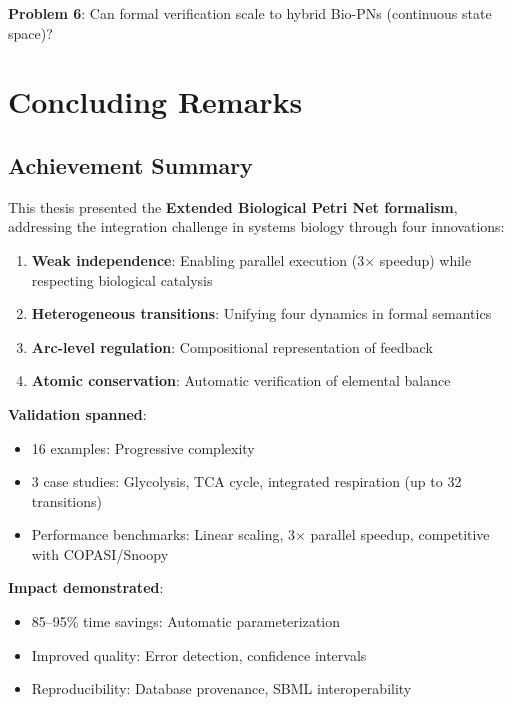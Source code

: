 \textbf{Problem 6}: Can formal verification scale to hybrid Bio-PNs (continuous state space)?

\section{Concluding Remarks}
\label{sec:concluding-remarks}

\subsection{Achievement Summary}
\label{subsec:achievement-summary}

This thesis presented the \textbf{Extended Biological Petri Net formalism}, addressing the integration challenge in systems biology through four innovations:

\begin{enumerate}
    \item \textbf{Weak independence}: Enabling parallel execution (3$\times$ speedup) while respecting biological catalysis
    \item \textbf{Heterogeneous transitions}: Unifying four dynamics in formal semantics
    \item \textbf{Arc-level regulation}: Compositional representation of feedback
    \item \textbf{Atomic conservation}: Automatic verification of elemental balance
\end{enumerate}

\textbf{Validation spanned}:
\begin{itemize}
    \item 16 examples: Progressive complexity
    \item 3 case studies: Glycolysis, TCA cycle, integrated respiration (up to 32 transitions)
    \item Performance benchmarks: Linear scaling, 3$\times$ parallel speedup, competitive with COPASI/Snoopy
\end{itemize}

\textbf{Impact demonstrated}:
\begin{itemize}
    \item 85--95\% time savings: Automatic parameterization
    \item Improved quality: Error detection, confidence intervals
    \item Reproducibility: Database provenance, SBML interoperability
\end{itemize}

